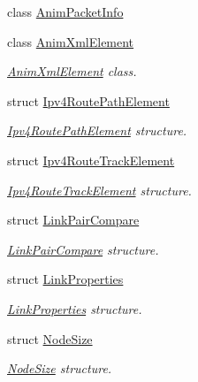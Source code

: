 \begin{DoxyCompactItemize}
\item 
class \hyperlink{classns3_1_1AnimationInterface_1_1AnimPacketInfo}{Anim\+Packet\+Info}
\item 
class \hyperlink{classns3_1_1AnimationInterface_1_1AnimXmlElement}{Anim\+Xml\+Element}
\begin{DoxyCompactList}\small\item\em \hyperlink{classns3_1_1AnimationInterface_1_1AnimXmlElement}{Anim\+Xml\+Element} class. \end{DoxyCompactList}\item 
struct \hyperlink{structns3_1_1AnimationInterface_1_1Ipv4RoutePathElement}{Ipv4\+Route\+Path\+Element}
\begin{DoxyCompactList}\small\item\em \hyperlink{structns3_1_1AnimationInterface_1_1Ipv4RoutePathElement}{Ipv4\+Route\+Path\+Element} structure. \end{DoxyCompactList}\item 
struct \hyperlink{structns3_1_1AnimationInterface_1_1Ipv4RouteTrackElement}{Ipv4\+Route\+Track\+Element}
\begin{DoxyCompactList}\small\item\em \hyperlink{structns3_1_1AnimationInterface_1_1Ipv4RouteTrackElement}{Ipv4\+Route\+Track\+Element} structure. \end{DoxyCompactList}\item 
struct \hyperlink{structns3_1_1AnimationInterface_1_1LinkPairCompare}{Link\+Pair\+Compare}
\begin{DoxyCompactList}\small\item\em \hyperlink{structns3_1_1AnimationInterface_1_1LinkPairCompare}{Link\+Pair\+Compare} structure. \end{DoxyCompactList}\item 
struct \hyperlink{structns3_1_1AnimationInterface_1_1LinkProperties}{Link\+Properties}
\begin{DoxyCompactList}\small\item\em \hyperlink{structns3_1_1AnimationInterface_1_1LinkProperties}{Link\+Properties} structure. \end{DoxyCompactList}\item 
struct \hyperlink{structns3_1_1AnimationInterface_1_1NodeSize}{Node\+Size}
\begin{DoxyCompactList}\small\item\em \hyperlink{structns3_1_1AnimationInterface_1_1NodeSize}{Node\+Size} structure. \end{DoxyCompactList}\item 

\end{DoxyCompactItemize}

